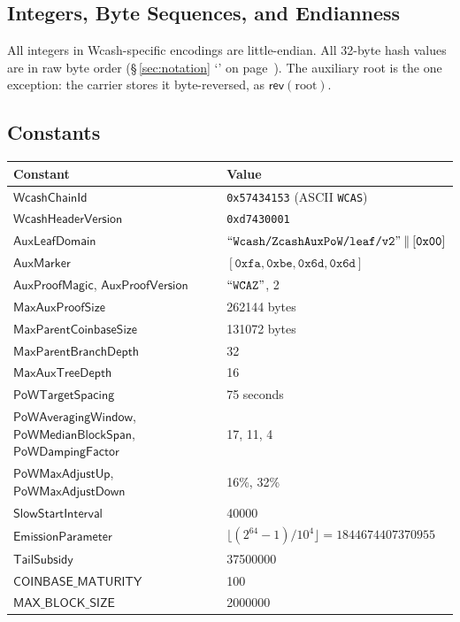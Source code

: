 \documentclass[10pt,letterpaper]{article}
\newcommand\fn[1]{\mathsf{#1}}
\newcommand\cat{\mathbin{\|}}
\newcommand\ascii[1]{\text{\textquotedblleft\texttt{#1}\textquotedblright}}
\newcommand\secref[1]{\S\,\ref{#1} `\nameref{#1}' on page~\pageref{#1}}
\theoremstyle{plain}
\begin{document}
\subsection{Integers, Byte Sequences, and Endianness}\label{sec:endianness}

All integers in Wcash-specific encodings are little-endian. All 32-byte hash values are in raw byte order (\secref{sec:notation}). The auxiliary root is the one exception: the carrier stores it byte-reversed, as $\fn{rev}(\mathrm{root})$.

\subsection{Constants}\label{sec:constants}

\begin{center}\small
\begin{tabular}{|l|l|}
\hline
\textbf{Constant} & \textbf{Value}\\
\hline
$\fn{WcashChainId}$ & \texttt{0x57434153} (ASCII \texttt{WCAS})\\
$\fn{WcashHeaderVersion}$ & \texttt{0xd7430001}\\
$\fn{AuxLeafDomain}$ & $\ascii{Wcash/ZcashAuxPoW/leaf/v2} \cat [\mathtt{0x00}]$\\
$\fn{AuxMarker}$ & $[\mathtt{0xfa}, \mathtt{0xbe}, \mathtt{0x6d}, \mathtt{0x6d}]$\\
$\fn{AuxProofMagic}$, $\fn{AuxProofVersion}$ & $\ascii{WCAZ}$, 2\\
$\fn{MaxAuxProofSize}$ & 262144 bytes\\
$\fn{MaxParentCoinbaseSize}$ & 131072 bytes\\
$\fn{MaxParentBranchDepth}$ & 32\\
$\fn{MaxAuxTreeDepth}$ & 16\\
$\fn{PoWTargetSpacing}$ & 75 seconds\\
$\fn{PoWAveragingWindow}$, $\fn{PoWMedianBlockSpan}$, $\fn{PoWDampingFactor}$ & 17, 11, 4\\
$\fn{PoWMaxAdjustUp}$, $\fn{PoWMaxAdjustDown}$ & 16\%, 32\%\\
$\fn{SlowStartInterval}$ & 40000\\
$\fn{EmissionParameter}$ & $\lfloor (2^{64}-1)/10^4 \rfloor = 1844674407370955$\\
$\fn{TailSubsidy}$ & 37500000\\
$\fn{COINBASE\_MATURITY}$ & 100\\
$\fn{MAX\_BLOCK\_SIZE}$ & 2000000\\
\hline
\end{tabular}
\end{center}
\end{document}
